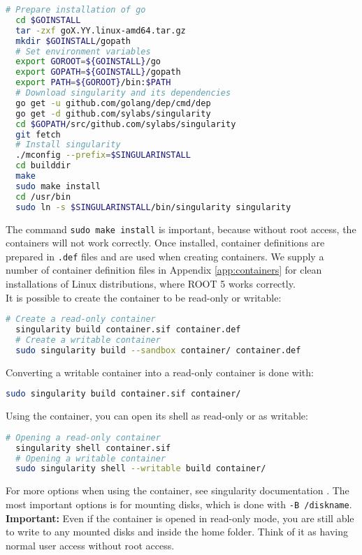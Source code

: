 \documentclass[12pt,a4paper]{report}
\begin{document}
\begin{lstlisting}[language=bash]
  # Prepare installation of go
  cd $GOINSTALL
  tar -zxf goX.YY.linux-amd64.tar.gz
  mkdir $GOINSTALL/gopath
  # Set environment variables
  export GOROOT=${GOINSTALL}/go
  export GOPATH=${GOINSTALL}/gopath
  export PATH=${GOROOT}/bin:$PATH
  # Download singularity and its dependencies
  go get -u github.com/golang/dep/cmd/dep
  go get -d github.com/sylabs/singularity
  cd $GOPATH/src/github.com/sylabs/singularity
  git fetch
  # Install singularity
  ./mconfig --prefix=$SINGULARINSTALL
  cd builddir
  make
  sudo make install
  cd /usr/bin
  sudo ln -s $SINGULARINSTALL/bin/singularity singularity
\end{lstlisting}
The command \texttt{sudo make install} is important, because without root access, the containers will not work correctly. Once installed, container definitions are prepared in \texttt{.def} files and are used when creating containers. We supply a number of container definition files in Appendix \ref{app:containers} for clean installations of Linux distributions, where ROOT 5 works correctly.\\
It is possible to create the container to be read-only or writable:
\begin{lstlisting}[language=bash]
  # Create a read-only container
  singularity build container.sif container.def
  # Create a writable container
  sudo singularity build --sandbox container/ container.def
\end{lstlisting}
Converting a writable container into a read-only container is done with:
\begin{lstlisting}[language=bash]
  sudo singularity build container.sif container/
\end{lstlisting}
Using the container, you can open its shell as read-only or as writable:
\begin{lstlisting}[language=bash]
  # Opening a read-only container
  singularity shell container.sif
  # Opening a writable container
  sudo singularity shell --writable build container/
\end{lstlisting}
For more options when using the container, see singularity documentation \cite{singularitydoc}. The most important options is for mounting disks, which is done with \linebreak\texttt{-B /diskname}.\\
\textbf{Important:} Even if the container is opened in read-only mode, you are still able to write to any mounted disks and inside the home folder. Think of it as having normal user access without root access.
\end{document}
